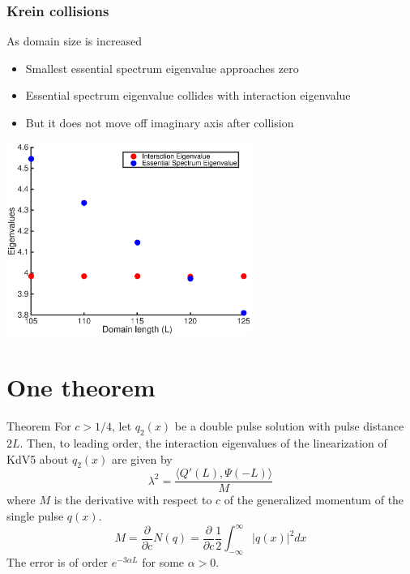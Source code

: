 \documentclass[16pt]{beamer}
\begin{document}
\begin{frame}
	\frametitle{Krein collisions}
	\fontsize{14}{7.2}\selectfont
	As domain size is increased
	\begin{itemize}
		\item Smallest essential spectrum eigenvalue approaches zero
		\item Essential spectrum eigenvalue collides with interaction eigenvalue
		\item But it does not move off imaginary axis after collision
	\end{itemize}
	\begin{center}
	\includegraphics[width=0.6\textwidth]{images/kreincollision.eps}
	\end{center}
\end{frame}

\section{One theorem}

\begin{frame}
	\fontsize{14}{7.2}\selectfont

	\begin{block}{Theorem}
	For $c > 1/4$, let $q_2(x)$ be a double pulse solution with pulse distance $2L$. Then, to leading order, the interaction eigenvalues of the linearization of KdV5 about $q_2(x)$ are given by
 	\[
 		\lambda^2 = \frac{\langle Q'(L), \Psi(-L) \rangle }{M}
	\]
	where $M$ is the derivative with respect to $c$ of the generalized momentum of the single pulse $q(x)$.
	\[
	M = \frac{\partial}{\partial c} N(q) = \frac{\partial}{\partial c} \frac{1}{2} \int_{-\infty}^\infty |q(x)|^2 dx 
	\]
	The error is of order $e^{-3 \alpha L}$ for some $\alpha > 0$.
	\end{block}
\end{frame}
\end{document}
